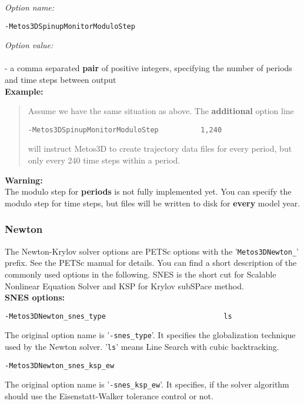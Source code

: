 \documentclass{article}
\begin{document}
\emph{Option name:}
\begin{verbatim}
-Metos3DSpinupMonitorModuloStep
\end{verbatim}

\emph{Option value:} \\
\vspace{-0.3cm}\\
- a comma separated \textbf{pair} of positive integers, specifying 
the number of periods and time steps between output \\

\textbf{Example:}
\begin{quote}
Assume we have the same situation as above. The \textbf{additional} option line
\begin{verbatim}
-Metos3DSpinupMonitorModuloStep          1,240
\end{verbatim}
will instruct Metos3D to create trajectory data files for every
period, but only every 240 time steps within a period.
\end{quote}

\textbf{Warning:} \medskip
\\
The modulo step for \textbf{periods} is not fully implemented yet.
You can specify the modulo step for time steps, but files will be written
to disk for \textbf{every} model year.

\subsubsection{Newton}

The Newton-Krylov solver options are PETSc options with the
'\texttt{Metos3DNewton\_}' prefix. See the PETSc manual for details.
You can find a short description of the commonly used options
in the following. SNES is the short cut for Scalable Nonlinear
Equation Solver and KSP for Krylov subSPace method. \\

\textbf{SNES options:}

\begin{verbatim}
-Metos3DNewton_snes_type                            ls
\end{verbatim}
The original option name is '\texttt{-snes\_type}'. It specifies the
globalization technique used by the Newton solver. '\texttt{ls}'
means Line Search with cubic backtracking.

\begin{verbatim}
-Metos3DNewton_snes_ksp_ew
\end{verbatim}
The original option name is '\texttt{-snes\_ksp\_ew}'. It specifies,
if the solver algorithm should use the Eisenstatt-Walker \cite{EisWal1996}
tolerance control or not.
\end{document}
